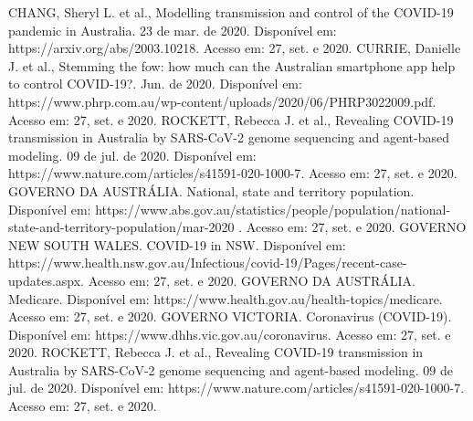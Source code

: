\documentclass{article}
\begin{document}
\begin{thebibliography}{Bibliografia}
 CHANG, Sheryl L. et al.,  Modelling transmission and control of the COVID-19 pandemic in Australia. 23 de mar. de 2020. Disponível em: https://arxiv.org/abs/2003.10218. Acesso em: 27, set. e 2020.
 CURRIE, Danielle J. et al.,  Stemming the fow: how much can the
Australian smartphone app help to control
COVID-19?. Jun. de 2020. Disponível em: https://www.phrp.com.au/wp-content/uploads/2020/06/PHRP3022009.pdf. Acesso em: 27, set. e 2020.
  ROCKETT, Rebecca J. et al.,  Revealing COVID-19 transmission in Australia by SARS-CoV-2 genome sequencing and agent-based modeling. 09 de jul. de 2020. Disponível em: https://www.nature.com/articles/s41591-020-1000-7. Acesso em: 27, set. e 2020.
 GOVERNO DA AUSTRÁLIA. National, state and territory population. Disponível em: https://www.abs.gov.au/statistics/people/population/national-state-and-territory-population/mar-2020 . Acesso em: 27, set. e 2020.
 GOVERNO NEW SOUTH WALES. COVID-19 in NSW. Disponível em: https://www.health.nsw.gov.au/Infectious/covid-19/Pages/recent-case-updates.aspx. Acesso em: 27, set. e 2020.
 GOVERNO DA AUSTRÁLIA. Medicare. Disponível em: https://www.health.gov.au/health-topics/medicare. Acesso em: 27, set. e 2020.
 GOVERNO VICTORIA. Coronavirus (COVID-19). Disponível em: https://www.dhhs.vic.gov.au/coronavirus. Acesso em: 27, set. e 2020.
  ROCKETT, Rebecca J. et al.,  Revealing COVID-19 transmission in Australia by SARS-CoV-2 genome sequencing and agent-based modeling. 09 de jul. de 2020. Disponível em: https://www.nature.com/articles/s41591-020-1000-7. Acesso em: 27, set. e 2020.
\end{thebibliography}
	
\end{document}
